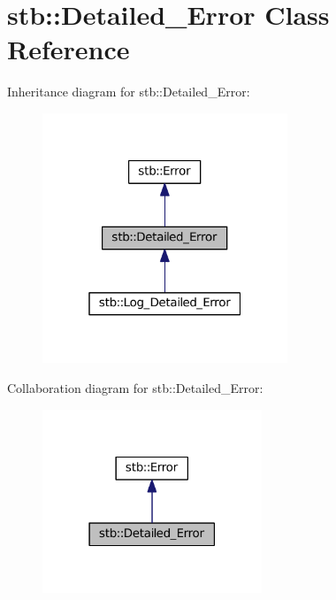 \hypertarget{classstb_1_1Detailed__Error}{\section{stb\+:\+:Detailed\+\_\+\+Error Class Reference}
\label{classstb_1_1Detailed__Error}
}


Inheritance diagram for stb\+:\+:Detailed\+\_\+\+Error\+:
\nopagebreak
\begin{figure}[H]
\begin{center}
\leavevmode
\includegraphics[width=208pt]{classstb_1_1Detailed__Error__inherit__graph}
\end{center}
\end{figure}


Collaboration diagram for stb\+:\+:Detailed\+\_\+\+Error\+:
\nopagebreak
\begin{figure}[H]
\begin{center}
\leavevmode
\includegraphics[width=186pt]{classstb_1_1Detailed__Error__coll__graph}
\end{center}
\end{figure}
